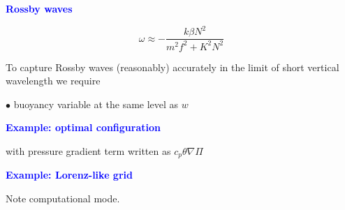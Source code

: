 \documentclass[a4]{seminar}
\newcommand{\B}[1]{\textcolor{blue}{#1}}
\begin{document}

\begin{slide}

\B{\bf Rossby waves}

\begin{displaymath}
\omega \approx - \frac{k \beta N^2}{m^2 f^2 + K^2 N^2}
\end{displaymath}


\vspace{3mm}

To capture Rossby waves (reasonably) accurately in the limit
of short vertical wavelength we require

\vspace{2mm}

\( \bullet \) buoyancy variable at the same level as \( w \)


\end{slide}


\begin{slide}

\B{\bf Example: optimal configuration}

\begin{center}
\end{center}

with pressure gradient term written as \( c_p \theta \nabla \Pi \) 


\end{slide}


\begin{slide}

\begin{center}
\end{center}


\end{slide}


\begin{slide}

\B{\bf Example: Lorenz-like grid}

\begin{center}
\end{center}

Note computational mode.

\end{slide}
\end{document}
